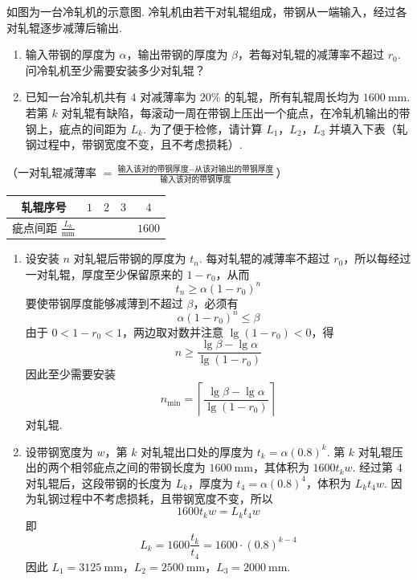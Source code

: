 \documentclass[UTF8,a4paper,oneside,11pt]{ctexbook}
\begin{document}
\begin{problem}
如图为一台冷轧机的示意图. 冷轧机由若干对轧辊组成，带钢从一端输入，经过各对轧辊逐步减薄后输出.

\begin{enumerate}
\item 输入带钢的厚度为 \(\alpha\)，输出带钢的厚度为 \(\beta\)，若每对轧辊的减薄率不超过 \(r_0\). 问冷轧机至少需要安装多少对轧辊？
\item 已知一台冷轧机共有 \(4\) 对减薄率为 \(20\%\) 的轧辊，所有轧辊周长均为 \(1600\mathrm{~mm}\). 若第 \(k\) 对轧辊有缺陷，每滚动一周在带钢上压出一个疵点，在冷轧机输出的带钢上，疵点的间距为 \(L_k\). 为了便于检修，请计算 \(L_1\)，\(L_2\)，\(L_3\) 并填入下表（轧钢过程中，带钢宽度不变，且不考虑损耗）.
\end{enumerate}

（一对轧辊减薄率 \(=\frac{\text{输入该对的带钢厚度}-\text{从该对输出的带钢厚度}}{\text{输入该对的带钢厚度}}\)）

\begin{center}
\begin{tabular}{|c|c|c|c|c|}
\hline
轧辊序号 & \(1\) & \(2\) & \(3\) & \(4\) \\
\hline
疵点间距 \(\frac{L_k}{\mathrm{mm}}\) &  &  &  & \(1600\) \\
\hline
\end{tabular}
\end{center}

\end{problem}

\begin{solution}
\begin{enumerate}
\item 设安装 \(n\) 对轧辊后带钢的厚度为 \(t_n\). 每对轧辊的减薄率不超过 \(r_0\)，所以每经过一对轧辊，厚度至少保留原来的 \(1-r_0\)，从而
\[
t_n\geqslant\alpha(1-r_0)^n
\]
要使带钢厚度能够减薄到不超过 \(\beta\)，必须有
\[
\alpha(1-r_0)^n\leqslant\beta
\]
由于 \(0<1-r_0<1\)，两边取对数并注意 \(\lg(1-r_0)<0\)，得
\[
n\geqslant\frac{\lg\beta-\lg\alpha}{\lg(1-r_0)}
\]
因此至少需要安装
\[
n_{\min}=\left\lceil\frac{\lg\beta-\lg\alpha}{\lg(1-r_0)}\right\rceil
\]
对轧辊.

\item 设带钢宽度为 \(w\)，第 \(k\) 对轧辊出口处的厚度为 \(t_k=\alpha(0.8)^k\). 第 \(k\) 对轧辊压出的两个相邻疵点之间的带钢长度为 \(1600\mathrm{~mm}\)，其体积为 \(1600t_kw\). 经过第 \(4\) 对轧辊后，这段带钢的长度为 \(L_k\)，厚度为 \(t_4=\alpha(0.8)^4\)，体积为 \(L_kt_4w\). 因为轧钢过程中不考虑损耗，且带钢宽度不变，所以
\[
1600t_kw=L_kt_4w
\]
即
\[
L_k=1600\frac{t_k}{t_4}=1600\cdot(0.8)^{k-4}
\]
因此 \(L_1=3125\mathrm{~mm}\)，\(L_2=2500\mathrm{~mm}\)，\(L_3=2000\mathrm{~mm}\).
\end{enumerate}
\end{solution}
\end{document}
